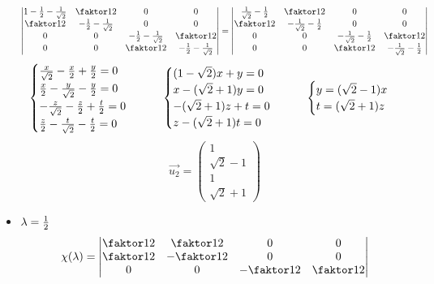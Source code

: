 \begin{itemize}
$$\begin{vmatrix}
        1 - \half - \frac1{\sqrt2} & \faktor12 & 0 & 0 \\
        \faktor12 & -\half - \frac1{\sqrt2} & 0 & 0 \\
        0 & 0 & -\half - \frac1{\sqrt2} & \faktor12 \\
        0 & 0 & \faktor12 & -\half - \frac1{\sqrt2}
    \end{vmatrix} =
    \begin{vmatrix}
    	\frac1{\sqrt2} - \half & \faktor12 & 0 & 0 \\
        \faktor12 & -\frac1{\sqrt2} - \half & 0 & 0 \\
        0 & 0 & -\frac1{\sqrt2} - \half & \faktor12 \\
        0 & 0 & \faktor12 & -\frac1{\sqrt2} - \half
    \end{vmatrix} $$
    $$
    \begin{cases}
    	\frac{x}{\sqrt2} - \half[x] + \half[y] = 0 \\
        \half[x] - \frac{y}{\sqrt2} - \half[y] = 0 \\
        -\frac{z}{\sqrt2} - \half[z] + \half[t] = 0 \\
        \half[z] - \frac{t}{\sqrt2} - \half[t] = 0
    \end{cases} \qquad
    \begin{cases}
    	(1 - \sqrt2)x + y = 0 \\
        x - (\sqrt2 + 1)y = 0 \\
        -(\sqrt2 + 1)z + t = 0 \\
        z - (\sqrt2 + 1)t = 0
    \end{cases} \qquad
    \begin{cases}
        y = (\sqrt2 - 1)x \\
        t = (\sqrt2 + 1)z
    \end{cases} $$
    $$ \vec{u_2} =
    \begin{pmatrix}
    	1 \\
        \sqrt2 - 1 \\
        1 \\
        \sqrt2 + 1
    \end{pmatrix} $$
    \item $ \lambda = \half $
    $$ \chi(\lambda) =
    \begin{vmatrix}
        \faktor12 & \faktor12 & 0 & 0 \\
        \faktor12 & -\faktor12 & 0 & 0 \\
        0 & 0 & -\faktor12 & \faktor12 \\

\end{vmatrix}$$
\end{itemize}
